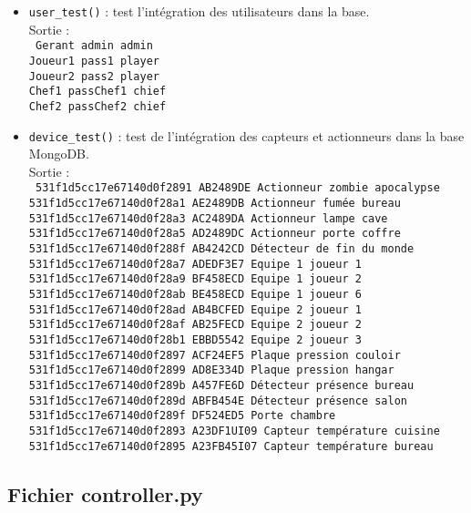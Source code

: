 \begin{itemize}
	\item \texttt{user\_test()} : test l'intégration des utilisateurs dans la base.\\ 
	Sortie : \\
	\texttt{
	Gerant admin admin\\
	Joueur1 pass1 player\\
	Joueur2 pass2 player\\
	Chef1 passChef1 chief\\
	Chef2 passChef2 chief\\
	}

	\item \texttt{device\_test()} : test de l'intégration des capteurs et actionneurs dans la base MongoDB.\\
	Sortie : \\
	\texttt{
	531f1d5cc17e67140d0f2891   AB2489DE   Actionneur zombie apocalypse\\
	531f1d5cc17e67140d0f28a1   AE2489DB   Actionneur fumée bureau\\
	531f1d5cc17e67140d0f28a3   AC2489DA   Actionneur lampe cave\\
	531f1d5cc17e67140d0f28a5   AD2489DC   Actionneur porte coffre\\
	531f1d5cc17e67140d0f288f   AB4242CD   Détecteur de fin du monde\\
	531f1d5cc17e67140d0f28a7   ADEDF3E7   Equipe 1 joueur 1\\
	531f1d5cc17e67140d0f28a9   BF458ECD   Equipe 1 joueur 2\\
	531f1d5cc17e67140d0f28ab   BE458ECD   Equipe 1 joueur 6\\
	531f1d5cc17e67140d0f28ad   AB4BCFED   Equipe 2 joueur 1\\
	531f1d5cc17e67140d0f28af   AB25FECD   Equipe 2 joueur 2\\
	531f1d5cc17e67140d0f28b1   EBBD5542   Equipe 2 joueur 3\\
	531f1d5cc17e67140d0f2897   ACF24EF5   Plaque pression couloir\\
	531f1d5cc17e67140d0f2899   AD8E334D   Plaque pression hangar\\
	531f1d5cc17e67140d0f289b   A457FE6D   Détecteur présence bureau\\
	531f1d5cc17e67140d0f289d   ABFB454E   Détecteur présence salon\\
	531f1d5cc17e67140d0f289f   DF524ED5   Porte chambre\\
	531f1d5cc17e67140d0f2893   A23DF1UI09   Capteur température cuisine\\
	531f1d5cc17e67140d0f2895   A23FB45I07   Capteur température bureau\\
	}
\end{itemize}

\subsection{Fichier controller.py}
